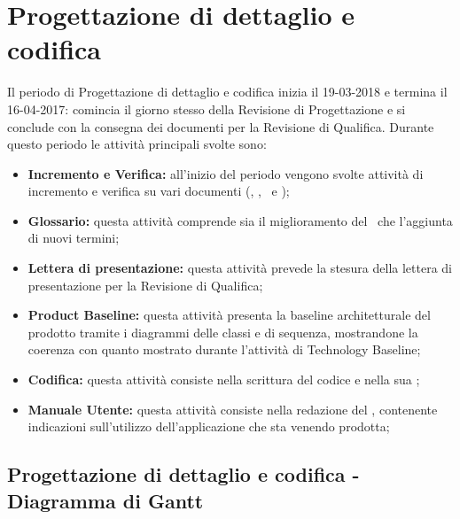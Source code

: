 \documentclass[PianoDiProgetto.tex]{subfiles}
\begin{document}
\section{Progettazione di dettaglio e codifica}
Il periodo di Progettazione di dettaglio e codifica inizia il 19-03-2018 e termina il 16-04-2017: comincia il giorno stesso della Revisione di Progettazione e si conclude con la consegna dei documenti per la Revisione di Qualifica. Durante questo periodo le attività principali svolte sono:
\begin{itemize}
	\item \textbf{Incremento e Verifica:} all'inizio del periodo vengono svolte attività di incremento e verifica su vari documenti (\ndp, \pdp, \pdq\ e \tb);
	\item \textbf{Glossario:} questa attività comprende sia il miglioramento del \g\ che l'aggiunta di nuovi termini;
	\item \textbf{Lettera di presentazione:} questa attività prevede la stesura della lettera di presentazione per la Revisione di Qualifica;
	\item \textbf{Product Baseline:} questa attività presenta la baseline architetturale del prodotto tramite i  diagrammi delle classi e di sequenza, mostrandone la coerenza con quanto mostrato durante l'attività di Technology Baseline;
	\item \textbf{Codifica:} questa attività consiste nella scrittura del codice e nella sua ;
	\item \textbf{Manuale Utente:} questa attività consiste nella redazione del \mut, contenente indicazioni sull’utilizzo dell'applicazione che sta venendo prodotta;
\end{itemize}
\begin{landscape}
		\subsection{Progettazione di dettaglio e codifica - Diagramma di Gantt}
\end{landscape}
\end{document}
